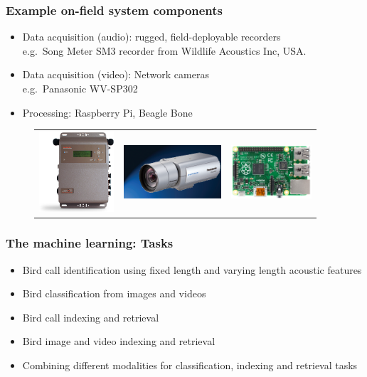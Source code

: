 \documentclass[mathserif]{beamer}
\begin{document}
\begin{frame}
\frametitle{Example on-field system components}
\vspace{-1cm}
\vspace{0.3cm}
\begin{itemize}
\item Data acquisition (audio): rugged, field-deployable recorders \\
e.g.~Song Meter SM3 recorder from Wildlife Acoustics Inc, USA. \\
\item Data acquisition (video): Network cameras \\
e.g.~Panasonic WV-SP302\\
\item Processing: Raspberry Pi, Beagle Bone 
\end{itemize}
\begin{figure}
	\begin{tabular}{c c c}
	\includegraphics[height=3cm]{figures/songMeter.png}&
	\includegraphics[height=2cm]{figures/pan_cam.png}&
	\includegraphics[height=2cm]{figures/rasp.jpg}
	\end{tabular}
	\end{figure}
\end{frame}


\begin{frame}
\frametitle{The machine learning: Tasks}
\begin{itemize}
\item<2-> Bird call identification using fixed length and varying length acoustic features 
\item<3-> Bird classification from images and videos
\item<4-> Bird call indexing and retrieval
\item<5-> Bird image and video indexing and retrieval
\item<6-> Combining different modalities for classification, indexing and retrieval tasks
\end{itemize}
\end{frame}
\end{document}
